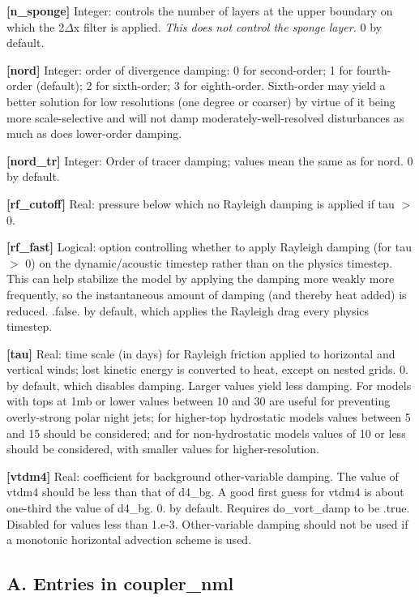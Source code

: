 {\bfseries \mbox{[}n\+\_\+sponge\mbox{]}} Integer\+: controls the number of layers at the upper boundary on which the 2{$\Delta$}x filter is applied. {\itshape This does not control the sponge layer.} 0 by default.

{\bfseries \mbox{[}nord\mbox{]}} Integer\+: order of divergence damping\+: 0 for second-\/order; 1 for fourth-\/order (default); 2 for sixth-\/order; 3 for eighth-\/order. Sixth-\/order may yield a better solution for low resolutions (one degree or coarser) by virtue of it being more scale-\/selective and will not damp moderately-\/well-\/resolved disturbances as much as does lower-\/order damping.

{\bfseries \mbox{[}nord\+\_\+tr\mbox{]}} Integer\+: Order of tracer damping; values mean the same as for nord. 0 by default.

{\bfseries \mbox{[}rf\+\_\+cutoff\mbox{]}} Real\+: pressure below which no Rayleigh damping is applied if tau $>$ 0.

{\bfseries \mbox{[}rf\+\_\+fast\mbox{]}} Logical\+: option controlling whether to apply Rayleigh damping (for tau $>$ 0) on the dynamic/acoustic timestep rather than on the physics timestep. This can help stabilize the model by applying the damping more weakly more frequently, so the instantaneous amount of damping (and thereby heat added) is reduced. .false. by default, which applies the Rayleigh drag every physics timestep.

{\bfseries \mbox{[}tau\mbox{]}} Real\+: time scale (in days) for Rayleigh friction applied to horizontal and vertical winds; lost kinetic energy is converted to heat, except on nested grids. 0. by default, which disables damping. Larger values yield less damping. For models with tops at 1mb or lower values between 10 and 30 are useful for preventing overly-\/strong polar night jets; for higher-\/top hydrostatic models values between 5 and 15 should be considered; and for non-\/hydrostatic models values of 10 or less should be considered, with smaller values for higher-\/resolution.

{\bfseries \mbox{[}vtdm4\mbox{]}} Real\+: coefficient for background other-\/variable damping. The value of vtdm4 should be less than that of d4\+\_\+bg. A good first guess for vtdm4 is about one-\/third the value of d4\+\_\+bg. 0. by default. Requires do\+\_\+vort\+\_\+damp to be .true. Disabled for values less than 1.\+e-\/3. Other-\/variable damping should not be used if a monotonic horizontal advection scheme is used.

\subsection*{A. Entries in coupler\+\_\+nml}

